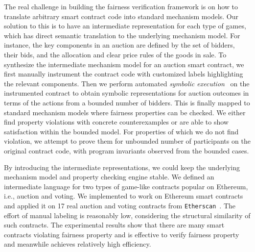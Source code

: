 The real challenge in building the fairness verification framework is on how to translate arbitrary
smart contract code into standard mechanism models.
Our solution to this is to have an intermediate representation for each type of games, which has
direct semantic translation to the underlying mechanism model.
For instance, the key components in an auction are defined by the set of bidders, their bids, and
the allocation and clear price rules of the goods in sale.
To synthesize the intermediate mechanism model for an auction smart contract, we first manually
instrument the contract code with customized labels highlighting the relevant components.
Then we perform automated \emph{symbolic execution}~\cite{king1976symbolic} on the instrumented
contract to obtain symbolic representations for auction outcomes in terms of the actions from a
bounded number of bidders.
This is finally mapped to standard mechanism models where fairness properties can be checked.
We either find property violations with concrete counterexamples or are able to show satisfaction
within the bounded model.
For properties of which we do not find violation, we attempt to prove them for unbounded number of
participants on the original contract code, with program invariants observed from the bounded cases.

By introducing the intermediate representations, we could keep the underlying mechanism model and
property checking engine stable.
We defined an intermediate language for two types of game-like contracts popular on Ethereum, i.e.,
auction and voting.
We implemented \faircon to work on Ethereum smart contracts and applied it on 17 real auction and
voting contracts from \texttt{Etherscan}~\cite{Etherscan}.
The effort of manual labeling is reasonably low, considering the structural similarity of such
contracts.
The experimental results show that there are many smart contracts violating fairness property and \faircon is effective to verify fairness property and meanwhile achieves relatively high efficiency.


